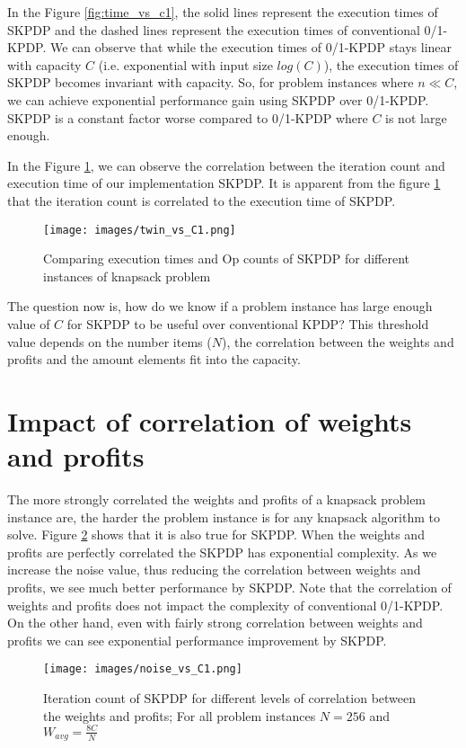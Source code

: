 In the Figure \ref{fig:time_vs_c1}, the solid lines represent the execution times of SKPDP and the dashed lines represent the execution times of conventional 0/1-KPDP. We can observe that while the execution times of 0/1-KPDP stays linear with capacity $C$ (i.e. exponential with input size $log(C)$), the execution times of SKPDP becomes invariant with capacity. So, for problem instances where $n \ll C$, we can achieve exponential performance gain using SKPDP over 0/1-KPDP. SKPDP is a constant factor worse compared to 0/1-KPDP where $C$ is not large enough.

In the Figure \ref{fig:twin_vs_c1}, we can observe the correlation between the iteration count and execution time of our implementation SKPDP. It is apparent from the figure \ref{fig:twin_vs_c1} that the iteration count is correlated to the execution time of SKPDP.

\begin{figure}[htbp]
\centerline{\texttt{[image: images/twin\_vs\_C1.png]}}
\caption{Comparing execution times and Op counts of SKPDP for different instances of knapsack problem}
\label{fig:twin_vs_c1}
\end{figure}

The question now is, how do we know if a problem instance has large enough value of $C$ for SKPDP to be useful over conventional KPDP? This threshold value depends on the number items ($N$), the correlation between the weights and profits and the amount elements fit into the capacity. 


\section{Impact of correlation of weights and profits}
The more strongly correlated the weights and profits of a knapsack problem instance are, the harder the problem instance is for any knapsack algorithm to solve. Figure \ref{fig:noise_vs_c1} shows that it is also true for SKPDP. When the weights and profits are perfectly correlated the SKPDP has exponential complexity. As we increase the noise value, thus reducing the correlation between weights and profits, we see much better performance by SKPDP. Note that the correlation of weights and profits does not impact the complexity of conventional 0/1-KPDP. On the other hand, even with fairly strong correlation between weights and profits we can see exponential performance improvement by SKPDP.

\begin{figure}[htbp]
\centerline{\texttt{[image: images/noise\_vs\_C1.png]}}
\caption{Iteration count of SKPDP for different levels of correlation between the weights and profits; For all problem instances $N = 256$ and $W_{avg} = \frac{8C}{N}$}
\label{fig:noise_vs_c1}
\end{figure}
\newpage



